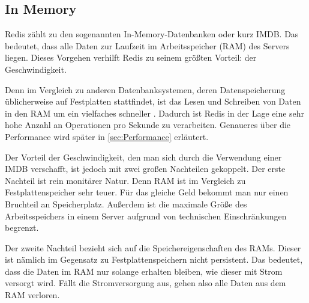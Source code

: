 
\subsection{In Memory}
\label{sec:inMemory}
Redis zählt zu den sogenannten In-Memory-Datenbanken oder kurz \acs{IMDB}. 
Das bedeutet, dass alle Daten zur Laufzeit im Arbeitsspeicher (RAM) des Servers liegen.
Dieses Vorgehen verhilft Redis zu seinem größten Vorteil: der Geschwindigkeit.

Denn im Vergleich zu anderen Datenbanksystemen, deren Datenspeicherung üblicherweise auf Festplatten stattfindet, ist das Lesen und Schreiben von Daten in den RAM um ein vielfaches schneller \cite{VL_Rechnerarchitektur}.
Dadurch ist Redis in der Lage eine sehr hohe Anzahl an Operationen pro Sekunde zu verarbeiten.
Genaueres über die Performance wird später in \autoref{sec:Performance} erläutert.

Der Vorteil der Geschwindigkeit, den man sich durch die Verwendung einer \acs{IMDB} verschafft, ist jedoch mit zwei großen Nachteilen gekoppelt.
Der erste Nachteil ist rein monitärer Natur. 
Denn RAM ist im Vergleich zu Festplattenspeicher sehr teuer. Für das gleiche Geld bekommt man nur einen Bruchteil an Speicherplatz.
Außerdem ist die maximale Größe des Arbeitsspeichers in einem Server aufgrund von technischen Einschränkungen begrenzt.

Der zweite Nachteil bezieht sich auf die Speichereigenschaften des RAMs.
Dieser ist nämlich im Gegensatz zu Festplattenspeichern nicht persistent.
Das bedeutet, dass die Daten im RAM nur solange erhalten bleiben, wie dieser mit Strom versorgt wird.
Fällt die Stromversorgung aus, gehen also alle Daten aus dem RAM verloren. 